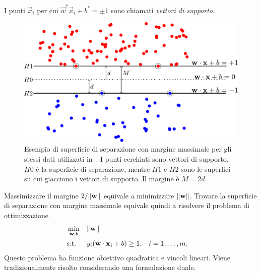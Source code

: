 I punti $\Vec{x}_i$ per cui $\Vec{w}^*\Vec{x}_i + b^* = \pm 1$ sono chiamati \emph{vettori di supporto}.
\begin{figure}
    \centering
    \includegraphics[width=0.7\linewidth]{img/margine_separazione.pdf}
    \caption{Esempio di superficie di separazione con margine massimale per gli stessi dati utilizzati in~. I punti cerchiati sono vettori di supporto. $H0$ è la superficie di separazione, mentre $H1$ e $H2$ sono le superfici su cui giacciono i vettori di supporto. Il margine è $M=2d$.}
    \label{fig:optimal_separation_margin}
\end{figure}
%
Massimizzare il margine $2/\norm{\vec{w}}$ equivale a minimizzare $\norm{\Vec{w}}$. 
Trovare la superficie di separazione con margine massimale equivale quindi a risolvere il problema di ottimizzazione
\begin{equation}
\label{eq:svc:hardmargin:primal}
\begin{aligned}
& \min_{\Vec{w},b} && \norm{\Vec{w}} \\
& \textrm{s.t.} && y_i(\Vec{w}\cdot \Vec{x}_i + b) \geq 1, && i=1,\dots,m. \\
\end{aligned}
\end{equation}
Questo problema ha funzione obiettivo quadratica e vincoli lineari.
Viene tradizionalmente risolto considerando una formulazione duale.

